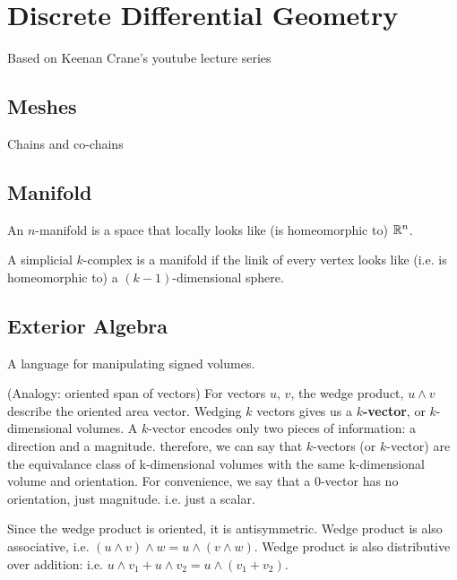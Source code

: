 \chapter{Discrete Differential Geometry}

Based on Keenan Crane's youtube lecture series

\section{Meshes}

\begin{definition}
\end{definition}

Chains and co-chains

\section{Manifold}

\begin{definition}[Manifold]
    An $n$-manifold is a space that locally looks like (is homeomorphic to) $\mathbb{R}^n$.
\end{definition}

\begin{definition}
    A simplicial $k$-complex is a manifold if the linik of every vertex looks like  (i.e. is homeomorphic to) a $(k-1)$-dimensional sphere.
\end{definition}
\section{Exterior Algebra}

A language for manipulating signed volumes.

\begin{definition}
    (Analogy: oriented span of vectors)
    For vectors $u,\,v$, the wedge product, $u \wedge v$ describe the oriented area vector. Wedging $k$ vectors gives us a {\bfseries $k$-vector}, or $k$-dimensional volumes. A $k$-vector encodes only two pieces of information: a direction and a magnitude. therefore, we can say that $k$-vectors (or $k$-vector) are the equivalance class of k-dimensional volumes with the same k-dimensional volume and orientation. For convenience, we say that a $0$-vector has no orientation, just magnitude. i.e. just a scalar.
\end{definition}
Since the wedge product is oriented, it is antisymmetric. Wedge product is also associative, i.e. $(u \wedge v) \wedge w = u \wedge (v \wedge w)$. Wedge product is also distributive over addition: i.e. $u \wedge v_1 + u \wedge v_2 = u \wedge (v_1 + v_2)$.

